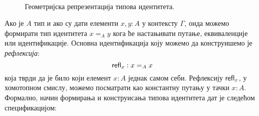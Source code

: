 \documentclass[12pt,oneside]{memoir}
\begin{document}
\begin{figure}[!ht]
    \centering\
    \label{fig:id_type}
    \caption{Геометријска репрезентација типова идентитета.}
\end{figure}

Ако је $A$ тип и ако су дати елементи $x, y : A$ у контексту $\Gamma$, онда можемо формирати тип идентитета $x =_A y$ кога ће настањивати путање, еквиваленције или идентификације. Основна идентификација коју можемо да конструишемо је \emph{рефлексија}:
\[ \mathsf{refl}_{x} : x =_A x \]
која тврди да је било који елемент $x : A$ једнак самом себи. Рефлексију $\mathsf{refl}_{x}$, у хомотопном смислу, можемо посматрати као константну путању у тачки $x : A$. Формално, начин формирања и конструисања типова идентитета дат је следећом спецификацијом:

\begin{samepage}
    \begin{center}
        \begin{minipage}{0.49\textwidth}
            \begin{prooftree}[$=$-form]
            \end{prooftree}
        \end{minipage}
        \begin{minipage}{0.39\textwidth}
            \begin{prooftree}[$=$-intro]
            \end{prooftree}
        \end{minipage}
    \end{center}
\end{samepage}
\end{document}
